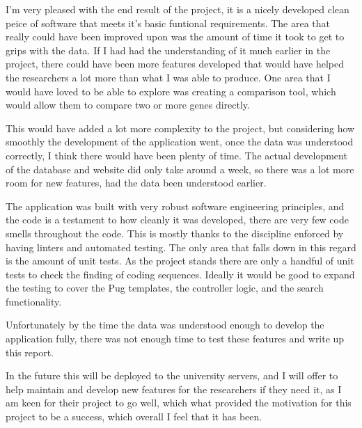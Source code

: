 
I'm very pleased with the end result of the project, it is a nicely developed clean peice of software that meets it's basic funtional requirements. The area that really could have been improved upon was the amount of time it took to get to grips with the data. If I had had the understanding of it much earlier in the project, there could have been more features developed that would have helped the researchers a lot more than what I was able to produce. One area that I would have loved to be able to explore was creating a comparison tool, which would allow them to compare two or more genes directly. 

This would have added a lot more complexity to the project, but considering how smoothly the development of the application went, once the data was understood correctly, I think there would have been plenty of time. The actual development of the database and website did only take around a week, so there was a lot more room for new features, had the data been understood earlier. 


The application was built with very robust software engineering principles, and the code is a testament to how cleanly it was developed, there are very few code smells\cite{smells} throughout the code. This is mostly thanks to the discipline enforced by having linters and automated testing. The only area that falls down in this regard is the amount of unit tests. As the project stands there are only a handful of unit tests to check the finding of coding sequences. Ideally it would be good to expand the testing to cover the Pug templates, the controller logic, and the search functionality. 

Unfortunately by the time the data was understood enough to develop the application fully, there was not enough time to test these features and write up this report. 

In the future this will be deployed to the university servers, and I will offer to help maintain and develop new features for the researchers if they need it, as I am keen for their project to go well, which what provided the motivation for this project to be a success, which overall I feel that it has been. 
